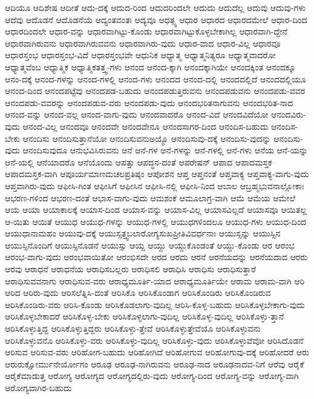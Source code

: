 {ಆದಿಯೂ
ಆದಿಶೇಷ
ಆದೀತೆ
ಆದು-ದಕ್ಕೆ
ಆದುದ-ರಿಂದ
ಆದುದರಿಂದಲೇ
ಆದುದು
ಆದುದೆಲ್ಲ
ಆದುವು
ಆದುವು-ಗಳು
ಆದೆವು
ಆದೊಡನೆ
ಆದೊಡನೆಯೆ
ಆದ್ಯಂತವಂತಃ
ಆದ್ಯವೂ
ಆಧತ್ಸ್ವ
ಆಧಾರ
ಆಧಾರದ
ಆಧಾರದಮೇಲೆ
ಆಧಾರ-ದಿಂದ
ಆಧಾರದಿಂದಲೇ
ಆಧಾರ-ವನ್ನು
ಆಧಾರವಾಗಿಟ್ಟು-ಕೊಂಡು
ಆಧಾರವಾಗಿಟ್ಟುಕೊಳ್ಳಬೇಕಾಗಿಲ್ಲ
ಆಧಾರವಾಗಿ-ದ್ದೇನೆ
ಆಧಾರವಾಗಿರುವನು
ಆಧಾರವಾಗಿರುವವನು
ಆಧಾರವಾಗಿರು-ವುದು
ಆಧಾರ-ವಾದ
ಆಧಾರ-ವಿಲ್ಲ
ಆಧಾರವೂ
ಆಧಾರಸ್ತಂಭ
ಆಧಾರಸ್ತಂಭ-ವಿದೆ
ಆಧಾರಸ್ತಂಭವೇ
ಆಧುನಿಕ
ಆಧ್ಯಾತ್ಮ
ಆಧ್ಯಾತ್ಮನಿತ್ಯರೂ
ಆಧ್ಯಾತ್ಮವಾದರೋ
ಆಧ್ಯಾತ್ಮವೆಂಬ
ಆಧ್ಯಾತ್ಮಿಕ
ಆಧ್ಯಾತ್ಮಿಕತತ್ತ್ವ-ಗಳು
ಆನಂದ
ಆನಂದ-ಕ್ಕಾಗಿ
ಆನಂದಕ್ಕಾಗಿಯೇ
ಆನಂದಕ್ಕಿಂತ
ಆನಂದಕ್ಕೂ
ಆನಂ-ದಕ್ಕೆ
ಆನಂದ-ಗಳನ್ನು
ಆನಂದ-ಗಳಲ್ಲಿ
ಆನಂದ-ಗಳು
ಆನಂದದ
ಆನಂದ-ದಲ್ಲಿ
ಆನಂದದಲ್ಲಿದೆ
ಆನಂದದಲ್ಲಿಯೂ
ಆನಂದ-ದಿಂದ
ಆನಂದಪಟ್ಟೆವು
ಆನಂದಪಡ-ಬಹುದು
ಆನಂದಪಡುತ್ತಿರುವನು
ಆನಂದಪಡುವನು
ಆನಂದಪಡು-ವವರ
ಆನಂದಪಡು-ವವರನ್ನು
ಆನಂದಪಡುವ-ವರು
ಆನಂದಪಡು-ವುದು
ಆನಂದಭರಿತನಾಗುವನು
ಆನಂದಭರಿತ-ನಾದ
ಆನಂದ-ವನ್ನು
ಆನಂದ-ವಲ್ಲ
ಆನಂದ-ವಾಗು-ವುದು
ಆನಂದವಾದರೊ
ಆನಂದ-ವಿದೆ
ಆನಂದವಿದೆಯೋ
ಆನಂದವಿರು-ವುದು
ಆನಂದ-ವಿಲ್ಲ
ಆನಂದವೂ
ಆನಂದವೇ
ಆನಂದವೇನೂ
ಆನಂದಸಾಗರ-ದಿಂದ
ಆನಂದಿಸ-ಬಹುದು
ಆನಂದಿಸ-ಬೇಕು
ಆನಂದಿಸು
ಆನಂದಿಸುತ್ತಾನೆಯೋ
ಆನಂದಿಸುವನುಅಯ್ಯೊ
ಆನಂದಿಸುವು-ದಕ್ಕೆ
ಆನಂದಿಸು-ವುದನ್ನು
ಆನಂದಿಸು-ವುದು
ಆನಂದಿಸುವುದೂ
ಆನುಭವಿಸಿರುವನು
ಆನೆ
ಆನೆ-ಗಳ
ಆನೆ-ಗಳನ್ನು
ಆನೆ-ಗಳಲ್ಲಿ
ಆನೆ-ಗಳು
ಆನೆಯ
ಆನೆ-ಯನ್ನು
ಆನೆ-ಯಲ್ಲಿ
ಆನೆಯಾದರೊ
ಆನೆಯೊಂದು
ಆಪತ್ತು
ಆಪದ್ಧನ-ದಂತೆ
ಆಪರೇಷನ್
ಆಪಾದ
ಆಪಾದಮಸ್ತಕ
ಆಪಾದಮಸ್ತಕ-ವಾಗಿ
ಆಪೂರ್ಯಮಾಣಮಚಲಪ್ರತಿಷ್ಠಂ
ಆಪೋಶನ
ಆಪ್ತ
ಆಪ್ತನಂತೆ
ಆಪ್ತವಾಕ್ಯ
ಆಪ್ತವಾಕ್ಯ-ವಾಗು-ವುದು
ಆಪ್ತವಾಗಿರು-ವುದು
ಆಫೀಸಿ-ಗಿಂತ
ಆಫೀಸಿಗೆ
ಆಫೀಸಿನ
ಆಫೀಸಿ-ನಲ್ಲಿ
ಆಫೀಸಿ-ನಿಂದ
ಆಬಾಲ
ಆಬ್ರಹ್ಮಭುವನಾಲ್ಲೋಕಾಃ
ಆಭರಣ-ಗಳಿಂದ
ಆಭರಣ-ದಂತೆ
ಆಭಾಸ-ವಾಗು-ವುದು
ಆಮಶಂಕೆ
ಆಮೂಲಾಗ್ರ-ವಾಗಿ
ಆಮೆ
ಆಮೆಯ
ಆಮೇಲೆ
ಆಯ
ಆಯಾ
ಆಯಾಕಾಲಕ್ಕೆ
ಆಯಾಸ-ದಿಂದ
ಆಯಾಸ-ವನ್ನು
ಆಯಾಸ-ವಿಲ್ಲ
ಆಯಾಸವಿಲ್ಲದೆ
ಆಯಾಸವೂ
ಆಯಿತಲ್ಲ
ಆ-ಯಿತು
ಆಯಿತೆ
ಆಯುಧ
ಆಯುಧ-ಗಳನ್ನು
ಆಯುಧ-ಗಳಲ್ಲಿ
ಆಯುಧಗಳಿಂದಲೂ
ಆಯುಧ-ಗಳು
ಆಯುಧ-ದಿಂದ
ಆಯುಧಾನಾಮಹಂ
ಆಯುವು-ದಕ್ಕೆ
ಆಯುಸ್ಸತ್ತ್ವಬಲಾರೋಗ್ಯಸುಖಪ್ರೀತಿವಿವರ್ಧನಾಃ
ಆಯುಸ್ಸನ್ನು
ಆಯುಸ್ಸಿನ
ಆಯುಸ್ಸಿನೊಂದಿಗೆ
ಆಯುಸ್ಸಿನೊಡನೆ
ಆಯುಸ್ಸು
ಆಯ್ದ
ಆಯ್ದು
ಆಯ್ದುಕೊಂಡಂತೆ
ಆಯ್ದು-ಕೊಂಡು
ಆರ
ಆರಂಭ
ಆರಂಭ-ವಾಗು-ವುದು
ಆರಂಭವಾಯಿತೋ
ಆರಂಭಿಸದೇ
ಆರದ
ಆರದು
ಆರನೆ
ಆರನೆಯದನ್ನು
ಆರನೆಯದಾದ
ಆರರು
ಆರವು
ಆರಾಧನೆ
ಆರಾಧನೆಯ
ಆರಾಧಿಸಬಲ್ಲರು
ಆರಾಧಿಸಲಿ
ಆರಾಧಿಸಿ
ಆರಾಧಿಸು
ಆರಾಧಿಸುತ್ತಾರೆ
ಆರಾಧಿಸುವವನಾಗು
ಆರಾಧಿಸುವ-ವರು
ಆರಾಧ್ಯಮೂರ್ತಿ-ಯಾದ
ಆರಾಧ್ಯಮೂರ್ತಿಯೇ
ಆರಾಮ
ಆರಾಮ-ವಾಗಿ
ಆರಿ
ಆರಿದ
ಆರಿರು-ವುದು
ಆರಿಸಲೆತ್ನಿಸಿ-ದಂತೆ
ಆರಿಸಿಕೊ
ಆರಿಸಿಕೊಂಡಾಗ
ಆರಿಸಿಕೊಂಡಿರು
ಆರಿಸಿಕೊಂಡಿರುವ
ಆರಿಸಿಕೊಂಡಿರು-ವರು
ಆರಿಸಿ-ಕೊಂಡು
ಆರಿಸಿಕೊಡಲಾಗು-ವುದಿಲ್ಲ
ಆರಿಸಿ-ಕೊಳ್ಳ-ಬಹುದು
ಆರಿಸಿಕೊಳ್ಳಬೇಕಾಗು-ವುದು
ಆರಿಸಿಕೊಳ್ಳಬೇಕಾದರೆ
ಆರಿಸಿಕೊಳ್ಳ-ಬೇಕು
ಆರಿಸಿಕೊಳ್ಳಲಾಗು-ವುದಿಲ್ಲ
ಆರಿಸಿಕೊಳ್ಳ-ವುದಿಲ್ಲ
ಆರಿಸಿಕೊಳ್ಳು-ತ್ತಾನೆ
ಆರಿಸಿಕೊಳ್ಳುತ್ತಿದ್ದ
ಆರಿಸಿಕೊಳ್ಳುತ್ತಿದ್ದರು
ಆರಿಸಿಕೊಳ್ಳು-ತ್ತೇವೆ
ಆರಿಸಿಕೊಳ್ಳುತ್ತೇವೆಯೊ
ಆರಿಸಿಕೊಳ್ಳುವನು
ಆರಿಸಿಕೊಳ್ಳುವನೊ
ಆರಿಸಿಕೊಳ್ಳು-ವರು
ಆರಿಸಿಕೊಳ್ಳು-ವುದಿಲ್ಲ
ಆರಿಸಿಕೊಳ್ಳು-ವುದು
ಆರಿಸಿಕೊಳ್ಳುವೆವೋ
ಆರಿಸಿದೊಡನೆ
ಆರಿಸುವ
ಆರಿಸುವ-ವರು
ಆರಿಹೋಗ-ಬಹುದು
ಆರಿಹೋಗಿದೆ
ಆರಿಹೋಗುವ
ಆರಿಹೋಗುವು-ದಕ್ಕೆ
ಆರಿಹೋದರೆ
ಆರು
ಆರುರುಕ್ಷೋರ್ಮುನೇರ್ಯೋಗಂ
ಆರೂಢ
ಆರೂಢ-ನಾಗಿರುವನು
ಆರೂಢ-ನಾದ
ಆರೂಢನಾದವ-ನಿಗೆ
ಆರೆವು
ಆರೈಕೆ
ಆರೈಕೆಮಾಡುತ್ತ
ಆರೋಗ್ಯ
ಆರೋಗ್ಯದ
ಆರೋಗ್ಯದಲ್ಲಿರು-ವುದು
ಆರೋಗ್ಯ-ದಿಂದ
ಆರೋಗ್ಯ-ವನ್ನು
ಆರೋಗ್ಯ-ವಾಗಿ
ಆರೋಗ್ಯವಾಗಿರ-ಬಹುದು
}
